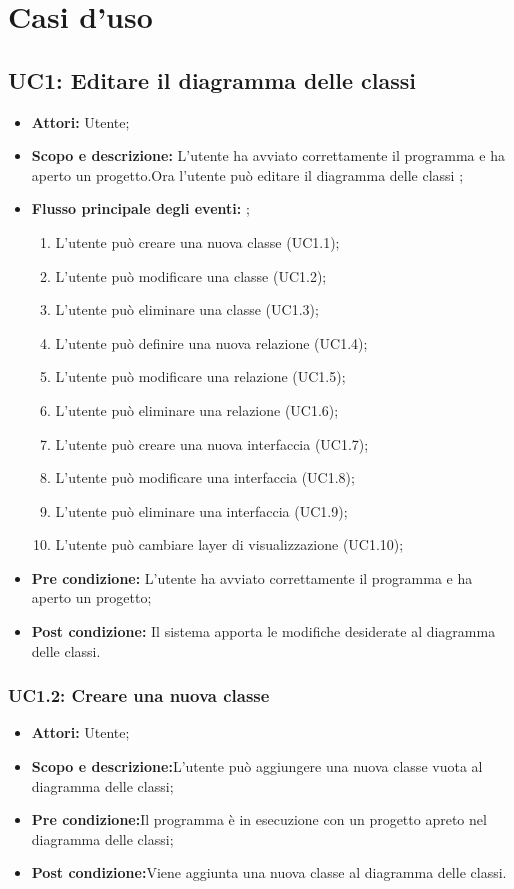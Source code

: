 \documentclass[a4paper]{report}
\begin{document}
\chapter{Casi d'uso }
\section{UC1: Editare il diagramma delle classi}
\begin{itemize}
	\item \textbf{Attori: }Utente;
	\item \textbf{Scopo e descrizione: }L'utente ha avviato correttamente il programma e ha aperto un progetto.Ora l'utente può editare il diagramma delle classi ;
	
	\item \textbf{Flusso principale degli eventi: } ;
	\begin{enumerate}
		\item L'utente può creare una nuova classe (UC1.1);
		\item L'utente può modificare una classe (UC1.2);
		\item L'utente può eliminare una classe (UC1.3);
		\item L'utente può definire una nuova relazione (UC1.4);
		\item L'utente può modificare una relazione (UC1.5);
		\item L'utente può eliminare una relazione (UC1.6);
		\item L'utente può creare una nuova interfaccia (UC1.7);
		\item L'utente può modificare una interfaccia (UC1.8);
		\item L'utente può eliminare una interfaccia (UC1.9);
		\item L'utente può cambiare layer di visualizzazione (UC1.10);
	\end{enumerate}
	\item \textbf{Pre condizione: }L'utente ha avviato correttamente il programma e ha aperto un progetto;
	\item \textbf{Post condizione: }Il sistema apporta le modifiche desiderate al diagramma delle classi.
\end{itemize}

\subsection{UC1.2: Creare una nuova classe}
\begin{itemize}
	\item \textbf{Attori:} Utente;
	\item \textbf{Scopo e descrizione:}L'utente può aggiungere una nuova classe vuota al diagramma delle classi;
	\item \textbf{Pre condizione:}Il programma è in esecuzione con un progetto apreto nel diagramma delle classi;
	\item \textbf{Post condizione:}Viene aggiunta una nuova classe al diagramma delle classi.
\end{itemize}
\end{document}
